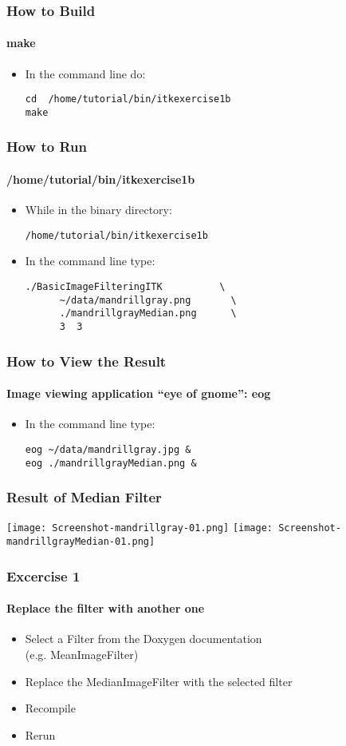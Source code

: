\begin{frame}[fragile]
\frametitle{How to Build}
\framesubtitle{make}
\begin{itemize}
\item In the command line do:
\begin{verbatim}
cd  /home/tutorial/bin/itkexercise1b
make
\end{verbatim}
\end{itemize}
\end{frame}

\begin{frame}[fragile]
\frametitle{How to Run}
\framesubtitle{/home/tutorial/bin/itkexercise1b}
\begin{itemize}
\item While in the binary directory:
\begin{verbatim}
/home/tutorial/bin/itkexercise1b
\end{verbatim}
\item In the command line type:
\begin{verbatim}
./BasicImageFilteringITK          \
      ~/data/mandrillgray.png       \
      ./mandrillgrayMedian.png      \
      3  3
\end{verbatim}
\end{itemize}
\end{frame}

\begin{frame}[fragile]
\frametitle{How to View the Result}
\framesubtitle{Image viewing application ``eye of gnome'': eog}
\begin{itemize}
\item In the command line type:
\begin{verbatim}
eog ~/data/mandrillgray.jpg &
eog ./mandrillgrayMedian.png &
\end{verbatim}
\end{itemize}
\end{frame}

\begin{frame}[fragile]
\frametitle{Result of Median Filter}
\begin{center}
  \texttt{[image: Screenshot-mandrillgray-01.png]}
  \texttt{[image: Screenshot-mandrillgrayMedian-01.png]}
\end{center}
\end{frame}

\begin{frame}[fragile]
\frametitle{Excercise 1}
\framesubtitle{Replace the filter with another one}
\begin{itemize}
\item Select a Filter from the Doxygen documentation\\
(e.g. MeanImageFilter)
\item Replace the MedianImageFilter with the selected filter
\item Recompile
\item Rerun
\end{itemize}
\end{frame}


